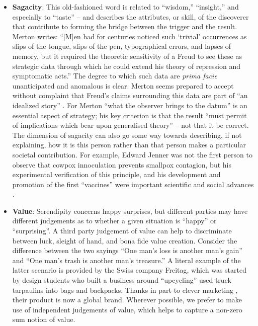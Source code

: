 \begin{itemize}
\item \textbf{Sagacity}: This old-fashioned word is related to
  ``wisdom,'' ``insight,'' and especially to ``taste'' -- and
  describes the attributes, or skill, of the discoverer that
  contribute to forming the bridge between the trigger and the result.
  Merton \citeyearpar[p.~507]{merton1948bearing} writes: ``{[}M{]}en
  had for centuries noticed such `trivial' occurrences as slips of the
  tongue, slips of the pen, typographical errors, and lapses of
  memory, but it required the theoretic sensitivity of a Freud to see
  these as strategic data through which he could extend his theory of
  repression and symptomatic acts.''  The degree to which such data
  are \emph{prima facie} unanticipated and anomalous is clear.  Merton
  seems prepared to accept without complaint that Freud's claims
  surrounding this data are part of ``an idealized story''
  \cite{freudtheory}.  For Merton ``what the observer brings to the
  datum'' is an essential aspect of strategy; his key criterion is
  that the result ``must permit of implications which bear upon
  generalised theory'' -- not that it be correct.  The dimension of
  sagacity can also go some way towards describing, if not explaining,
  how it is this person rather than that person makes a particular
  societal contribution.  For example, Edward Jenner was not the first
  person to observe that cowpox innoculation prevents smallpox
  contagion, but his experimental verification of this principle, and
  his development and promotion of the first ``vaccines'' were
  important scientific and social advances \cite{riedel2005edward}.
\end{itemize}


\begin{itemize}
\item \textbf{Value}: Serendipity concerns happy surprises, but
  different parties may have different judgements as to whether a
  given situation is ``happy'' or ``surprising''.  A third party
  judgement of value can help to discriminate between luck, sleight of
  hand, and bona fide value creation.  Consider the difference between
  the two sayings ``One man's loss is another man's gain'' and ``One
  man's trash is another man's treasure.''  A literal example of the
  latter scenario is provided by the Swiss company Freitag, which was
  started by design students who built a business around ``upcycling''
  used truck tarpaulins into bags and backpacks.  Thanks in part to
  clever marketing \cite[pp. 54--55, 68--69,]{russo2010companies},
  their product is now a global brand.  Wherever possible, we prefer
  to make use of independent judgements of value, which helps to
  capture a non-zero sum notion of value.
\end{itemize}

